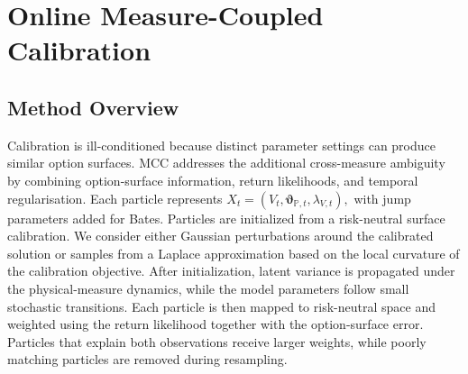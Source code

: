 \documentclass[sigconf,anonymous,review]{acmart}
\begin{document}

\section{Online Measure-Coupled Calibration}

\subsection{Method Overview}
\label{sec:method_intuition}
Calibration is ill-conditioned because distinct parameter settings can
produce similar option surfaces\cite{gatheral2006,cui2017full,mrazek2017calibration}. MCC addresses the additional cross-measure ambiguity by combining option-surface information, return likelihoods, and temporal regularisation. Each particle represents
$X_t =
\left(
V_t,
\boldsymbol{\vartheta}_{\mathbb{P},t},
\lambda_{V,t}
\right),
$
with jump parameters added for Bates.
Particles are initialized from a risk-neutral surface calibration. We consider either Gaussian perturbations around the calibrated solution or samples from a Laplace approximation based on the local curvature of the
calibration objective. After initialization, latent variance is propagated under the physical-measure dynamics, while the model parameters follow small stochastic transitions. Each particle is then mapped to risk-neutral space and weighted using the return likelihood together with the
option-surface error. Particles that explain both observations receive larger weights, while poorly matching particles are removed during resampling.


\end{document}
